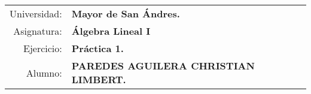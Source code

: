 \begin{tabular}{r l }
Universidad: & \textbf{Mayor de San Ándres.}\\
Asignatura: & \textbf{Álgebra Lineal I}\\
Ejercicio: & \textbf{Práctica 1.}\\ 
Alumno: & \textbf{PAREDES AGUILERA CHRISTIAN LIMBERT.}
\end{tabular}
\begin{flushleft}
\end{flushleft}

